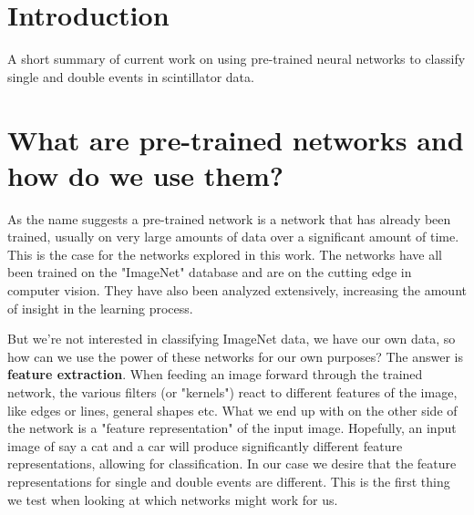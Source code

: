 \section{Introduction}
A short summary of current work on using pre-trained neural networks to classify
single and double events in scintillator data.

\section{What are pre-trained networks and how do we use them?}
As the name suggests a pre-trained network is a network that has already
been trained, usually on very large amounts of data over a significant amount
of time. This is the case for the networks explored in this work. The networks
have all been trained on the "ImageNet" database and are on the cutting edge in
computer vision. They have also been analyzed extensively, increasing the amount
of insight in the learning process.

But we're not interested in classifying ImageNet data, we have our own data,
so how can we use the power of these networks for our own purposes?
The answer is \textbf{feature extraction}. When feeding an image forward
through the trained network, the various filters (or "kernels") react to different features
of the image, like edges or lines, general shapes etc. What we end up with on the other side
of the network is a "feature representation" of the input image. Hopefully, an input image
of say a cat and a car will produce significantly different feature representations, allowing
for classification. In our case we desire that the feature representations for single and
double events are different. This is the first thing we test when looking at which networks
might work for us.
